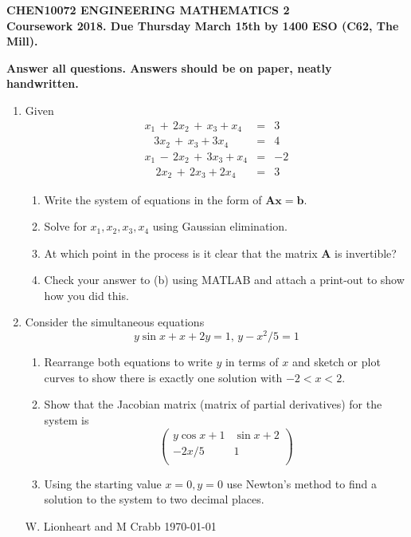 \documentclass[12pt]{article}
\def\bA{\mathbf{A}}
\begin{document}
\begin{center}{\bf\large
CHEN10072 ENGINEERING MATHEMATICS 2
\\
Coursework 2018. Due Thursday March 15th by 1400 ESO (C62, The Mill). 
}
\end{center}
\begin{center}{\bf
Answer all questions. Answers should be on paper, neatly handwritten.
}
\end{center}

\begin{enumerate}

\item 
Given
\vspace{-0.5cm}
\begin{eqnarray*}
x_1\,+\,2x_2\,+\,x_3 + x_4&=&3\\
\,\,\,\,\,3x_2\,+\,x_3 + 3x_4&=&4\\
x_1\,-\,2x_2\,+\,3x_3 + x_4&=&-2\\
\,\,\,\,\,\,2x_2\,+\,2x_3 + 2x_4&=&3
\end{eqnarray*}
            \begin{enumerate}
            \item Write the system of  equations in the form of $\bA \mathbf{x}=\mathbf{b}$.             
            \item  Solve for $x_1,x_2,x_3,x_4$ using Gaussian elimination.
            \item At which point in the process is it clear that the matrix $\mathbf{A}$ is invertible?
            \item Check your answer to (b) using  MATLAB and attach a print-out to show how you did this.
    \end{enumerate}
	

\item
Consider the simultaneous equations
\[
y \sin x+x+2 y=1,\, y- x^2/5=1
\]
\begin{enumerate}
	\item Rearrange both equations to write $y$ in terms of $x$ and sketch or plot curves to show there is exactly one solution with  $-2 <x<2$.
	\item Show that the Jacobian matrix (matrix of partial derivatives) for the  
system is
\[
\left(
\begin{array}{cc}
y \cos x+1 & \sin x+2 \\
-2 x/5 & 1 \\
\end{array}
\right)
\]
\item Using the starting value $x=0, y=0$ use Newton's method to find a solution to the system to two decimal places.
\end{enumerate}
\vspace{3cm}
\tiny{W. Lionheart and M Crabb \today}



\end{enumerate}
\end{document}

